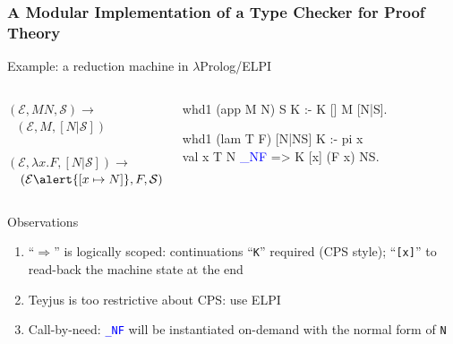 \documentclass{beamer}
\begin{document}
\begin{frame}[fragile]
\frametitle{\small A Modular Implementation of a Type Checker for Proof Theory}
\begin{block}{Example: a reduction machine in $\lambda$Prolog/ELPI}
{\small
\begin{columns}[c]
$(\mathcal{E}, MN, \mathcal{S}) \longrightarrow$\\
$~~~(\mathcal{E}, M, [N|\mathcal{S}])$\\
~\\
$(\mathcal{E}, \lambda x.F, [N|\mathcal{S}]) \longrightarrow$\\
$~~~(\mathcal{E}\alert{[x \mapsto N]}, F, \mathcal{S})$
\begin{semiverbatim}
whd1 (app M N) S K :-
  K [] M [N|S].

whd1 (lam T F) [N|NS] K :-
  pi x \\ \alert{val x T N \textcolor{blue}{_NF}} =>
    K [x] (F x) NS.
\end{semiverbatim}
\end{columns}}
\end{block}

\begin{block}{Observations}
 \begin{enumerate}
  \item ``$\Rightarrow$'' is logically scoped: \alert{continuations} ``\texttt{K}'' required \alert{(CPS style)}; ``\texttt{[x]}'' to read-back the machine state at the end
  \item Teyjus is too restrictive about CPS: use ELPI
  \item \alert{Call-by-need:} \texttt{\textcolor{blue}{\_NF}} will be instantiated on-demand with the normal form of \texttt{N}
 \end{enumerate}
\end{block}
\end{frame}
\end{document}
